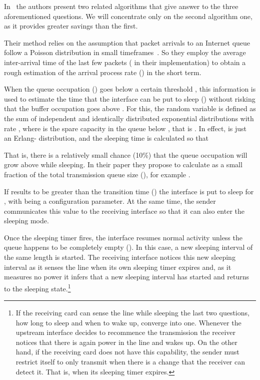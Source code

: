 \documentclass[conference,english]{IEEEtran}
\begin{document}
In~\cite{gupta07:_using_low_power_modes_for} the authors present two related
algorithms that give answer to the three aforementioned questions. We will
concentrate only on the second algorithm one, as it provides greater savings
than the first.

Their method relies on the assumption that packet arrivals to an Internet
queue follow a Poisson distribution in small
timeframes~\cite{karagiannis04:_nonst_poiss_view_of_inter_traff}. So they
employ the average inter-arrival time of the last few packets ( in their
implementation) to obtain a rough estimation of the arrival process rate
() in the short term.

When the queue occupation () goes below a certain threshold , this
information is used to estimate the time that the interface can be put to
sleep () without risking that the buffer occupation goes above
. For this, the random variable  is defined as the sum of 
independent and identically distributed exponential distributions with rate
, where  is the spare capacity in the queue below , that is
. In effect,  is just an Erlang- distribution, and the
sleeping time is calculated so that

That is, there is a relatively small chance (10\%) that the queue occupation
will grow above  while sleeping. In their paper they propose to calculate
 as a small fraction of the total transmission queue size (), for
example .

If  results to be greater than the transition time
() the interface is put to sleep for , with  being a configuration parameter. At
the same time, the sender communicates this value to the receiving interface
so that it can also enter the sleeping mode.

Once the sleeping timer fires, the interface resumes normal activity unless
the queue happens to be completely empty (). In this case,
a new sleeping interval of the same length is started. The receiving interface
notices this new sleeping interval as it senses the line when its own sleeping
timer expires and, as it measures no power it infers that a new sleeping
interval has started and returns to the sleeping state.\footnote{If the
  receiving card can sense the line while sleeping the last two questions, how
  long to sleep and when to wake up, converge into one. Whenever the upstream
  interface decides to recommence the transmission the receiver notices that
  there is again power in the line and wakes up. On the other hand, if the
  receiving card does not have this capability, the sender must restrict
  itself to only transmit when there is a change that the receiver can detect
  it. That is, when its sleeping timer expires.}
\end{document}

